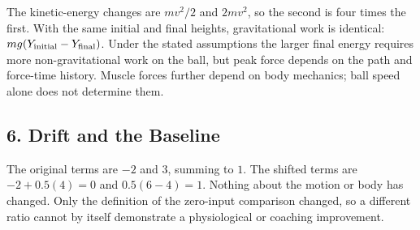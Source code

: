 The kinetic-energy changes are \(mv^2/2\) and \(2mv^2\), so the second is four times the first. With the same initial and final heights, gravitational work is identical: \(mg(Y_{\rm initial}-Y_{\rm final})\). Under the stated assumptions the larger final energy requires more non-gravitational work on the ball, but peak force depends on the path and force-time history. Muscle forces further depend on body mechanics; ball speed alone does not determine them.

\subsection*{6. Drift and the Baseline}\label{ch01:drift-and-the-baseline}

The original terms are \(-2\) and \(3\), summing to \(1\). The shifted terms are \(-2+0.5(4)=0\) and \(0.5(6-4)=1\). Nothing about the motion or body has changed. Only the definition of the zero-input comparison changed, so a different ratio cannot by itself demonstrate a physiological or coaching improvement.
